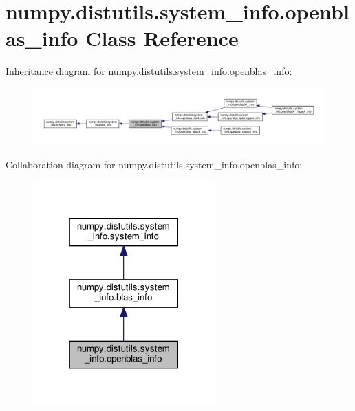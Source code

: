 \hypertarget{classnumpy_1_1distutils_1_1system__info_1_1openblas__info}{}\section{numpy.\+distutils.\+system\+\_\+info.\+openblas\+\_\+info Class Reference}
\label{classnumpy_1_1distutils_1_1system__info_1_1openblas__info}


Inheritance diagram for numpy.\+distutils.\+system\+\_\+info.\+openblas\+\_\+info\+:
\nopagebreak
\begin{figure}[H]
\begin{center}
\leavevmode
\includegraphics[width=350pt]{classnumpy_1_1distutils_1_1system__info_1_1openblas__info__inherit__graph}
\end{center}
\end{figure}


Collaboration diagram for numpy.\+distutils.\+system\+\_\+info.\+openblas\+\_\+info\+:
\nopagebreak
\begin{figure}[H]
\begin{center}
\leavevmode
\includegraphics[width=198pt]{classnumpy_1_1distutils_1_1system__info_1_1openblas__info__coll__graph}
\end{center}
\end{figure}
